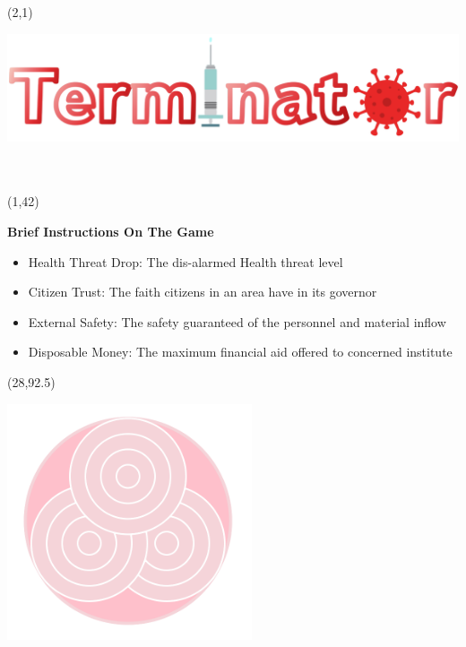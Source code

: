 \documentclass[hyperref={pdfpagelabels=false}]{beamer}
\begin{document}
\begin{frame}

	\begin{textblock}{45}(2,1)
		\begin{blankbox}
			\includegraphics[width=1000pt]{img/gamename.png} \\\hspace*{\fill} \\ \\
		\end{blankbox}
	\end{textblock}




\begin{textblock}{35}(1,42)
		\begin{blankbox}
		\huge \textbf{ Brief Instructions On The Game} \\

						\begin{itemize}
							\item Health Threat Drop: The dis-alarmed Health threat level
							\item Citizen Trust: The faith citizens in an area have in its governor
							\item External Safety: The safety guaranteed of the personnel and material inflow
							\item Disposable Money: The maximum financial aid offered to concerned institute
						\end{itemize}
			
		\end{blankbox}
	\end{textblock}





	\begin{textblock}{30}(28,92.5)
		\begin{blankbox}
			\includegraphics[width=205pt]{img/Teamlogo.png}


\end{blankbox}
\end{textblock}
\end{frame}
\end{document}
